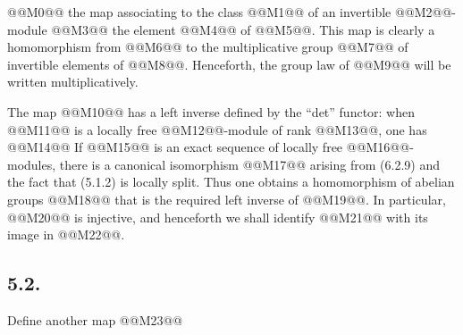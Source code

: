 
@@M0@@
the map associating to the class @@M1@@ of an invertible @@M2@@-module @@M3@@ the element @@M4@@ of @@M5@@. This map is clearly a homomorphism from @@M6@@ to the multiplicative group @@M7@@ of invertible elements of @@M8@@. Henceforth, the group law of @@M9@@ will be written multiplicatively.

The map @@M10@@ has a left inverse defined by the ``det'' functor: when @@M11@@ is a locally free @@M12@@-module of rank @@M13@@, one has
@@M14@@
If
@@M15@@
is an exact sequence of locally free @@M16@@-modules, there is a canonical isomorphism
@@M17@@
arising from (6.2.9) and the fact that (5.1.2) is locally split. Thus one obtains a homomorphism of abelian groups
@@M18@@
that is the required left inverse of @@M19@@. In particular, @@M20@@ is injective, and henceforth we shall identify @@M21@@ with its image in @@M22@@.

\subsection*{5.2.}
Define another map
@@M23@@

